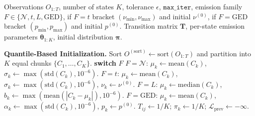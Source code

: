 \begin{breakablealgorithm}
\caption{Unified EM algorithm for the CHMM family. Lines~\ref{line:init}, \ref{line:emit}, and \ref{line:mstep} branch on the emission family $F \in \{\mathcal{N}, t, L, \text{GED}\}$; every other line is identical across families. The CHMM-N and CHMM-L variants instantiate classical EM; CHMM-t and CHMM-GED use ECM-style block updates whose shape step is a finite one-dimensional golden-section search. Hyperparameter defaults used throughout this paper: convergence tolerance $\epsilon = 10^{-4}$ on $\Delta \mathcal L$, $\texttt{max\_iter} = 60$, $40$-iteration golden-section sub-step on every bracketed update, CHMM-t bracket $(\nu_{\min}, \nu_{\max}) = (2.1, 50)$ with initial $\nu^{(0)} = 6$, CHMM-GED bracket $(p_{\min}, p_{\max}) = (0.5, 3.0)$ with initial $p^{(0)} = 1.5$ and a $\mu_k$ search interval widened to cover the observed data range.}
\label{alg:chmm_em}
\footnotesize
\setlength{\baselineskip}{0.95\baselineskip}
\begin{algorithmic}[1]
\REQUIRE Observations $O_{1:T}$, number of states $K$, tolerance $\epsilon$, $\texttt{max\_iter}$, emission family $F \in \{\mathcal{N}, t, L, \text{GED}\}$, if $F = t$ bracket $(\nu_{\min}, \nu_{\max})$ and initial $\nu^{(0)}$, if $F = \text{GED}$ bracket $(p_{\min}, p_{\max})$ and initial $p^{(0)}$.
\ENSURE Transition matrix $\mathbf{T}$, per-state emission parameters $\boldsymbol\theta_{1:K}$, initial distribution $\boldsymbol{\pi}$.

\STATE \textbf{Quantile-Based Initialization.}
\STATE Sort $O^{(\text{sort})} \leftarrow \text{sort}(O_{1:T})$ and partition into $K$ equal chunks $\{C_1,\ldots,C_K\}$.
 \label{line:init}
    \STATE \textbf{switch} $F$
    \STATE \quad $F = \mathcal{N}$: $\mu_k \leftarrow \text{mean}(C_k)$, \quad $\sigma_k \leftarrow \max(\text{std}(C_k), 10^{-6})$.
    \STATE \quad $F = t$: $\mu_k \leftarrow \text{mean}(C_k)$, \quad $\sigma_k \leftarrow \max(\text{std}(C_k), 10^{-6})$, \quad $\nu_k \leftarrow \nu^{(0)}$.
    \STATE \quad $F = L$: $\mu_k \leftarrow \text{median}(C_k)$, \quad $b_k \leftarrow \max(\text{mean}(|C_k - \mu_k|), 10^{-6})$. 
    \STATE \quad $F = \text{GED}$: $\mu_k \leftarrow \text{mean}(C_k)$, \quad $\alpha_k \leftarrow \max(\text{std}(C_k), 10^{-6})$, \quad $p_k \leftarrow p^{(0)}$.
\ENDFOR
\STATE $T_{ij} \leftarrow 1/K$; \quad $\pi_k \leftarrow 1/K$; \quad $\mathcal{L}_{\text{prev}} \leftarrow -\infty$.


\end{algorithmic}
\end{breakablealgorithm}
